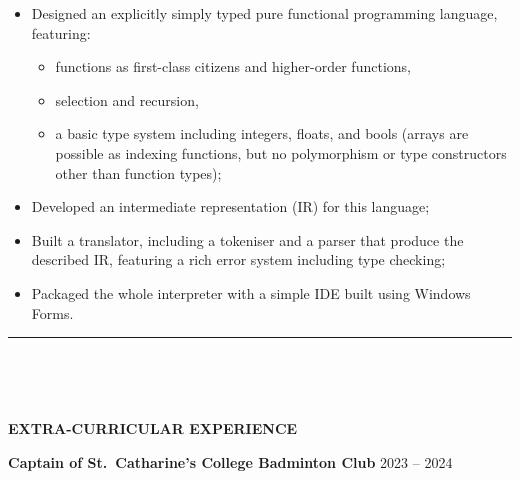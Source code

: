 \documentclass[
  11pt,
  a4paper,
]{article}
\providecommand{\tightlist}{%
  \setlength{\itemsep}{0pt}\setlength{\parskip}{0pt}}
\newcommand{\itemspace}{0.8ex}
\newcommand{\ruledheader}[2]{%
\begingroup
\setlength{\fboxsep}{0pt}%
\colorbox{#1}{%
\parbox[b][1.2ex][t]{35mm}{\begin{tiny}\ \end{tiny}}}%
\parbox[b][1.2ex][t]{5mm}{\begin{tiny}\ \end{tiny}}%
\uppercase{\textbf{#2}}
\endgroup}
\begin{document}
\begin{itemize}
\tightlist
\item
  Designed an explicitly simply typed pure functional programming
  language, featuring:

  \begin{itemize}
  \tightlist
  \item
    functions as first-class citizens and higher-order functions,
  \item
    selection and recursion,
  \item
    a basic type system including integers, floats, and bools (arrays
    are possible as indexing functions, but no polymorphism or type
    constructors other than function types);
  \end{itemize}
\item
  Developed an intermediate representation (IR) for this language;
\item
  Built a translator, including a tokeniser and a parser that produce
  the described IR, featuring a rich error system including type
  checking;
\item
  Packaged the whole interpreter with a simple IDE built using Windows
  Forms.
\end{itemize}

\begin{Large}

\vspace{-1.5ex}\rule{\textwidth}{0.8pt}\vspace{2ex}

\ruledheader{cyan!50!teal}{Extra-curricular experience}\end{Large}

\vspace{\itemspace}

\textbf{Captain of St.~Catharine’s College Badminton Club} \textbar{}
2023 – 2024
\end{document}
